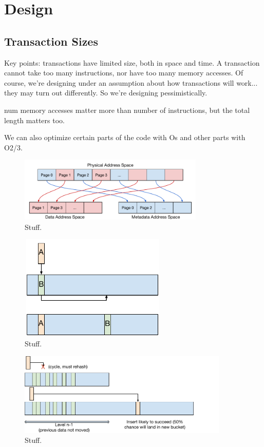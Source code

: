 \section{Design}


\subsection{Transaction Sizes}

Key points: transactions have limited size, both in space and time. A
transaction cannot take too many instructions, nor have too many memory
accesses. Of course, we're designing under an assumption about how transactions
will work... they may turn out differently. So we're designing pessimistically.

num memory accesses matter more than number of instructions, but the total length
matters too.

We can also optimize certain parts of the code with Os and other parts with
O2/3.













\begin{figure}
\centering
\hspace*{-0.3in}
\includegraphics[width=88mm]{fig/addrspace}
\caption{Stuff.}
\label{fig:addrspace}
\end{figure}

\begin{figure}
\centering
\includegraphics[width=70mm,height=50mm]{fig/cuckoo_insert}
\caption{Stuff.}
\label{fig:insert}
\end{figure}

\begin{figure}
\centering
\includegraphics[width=100mm]{fig/cuckoo_rehash}
\caption{Stuff.}
\label{fig:rehash}
\end{figure}

